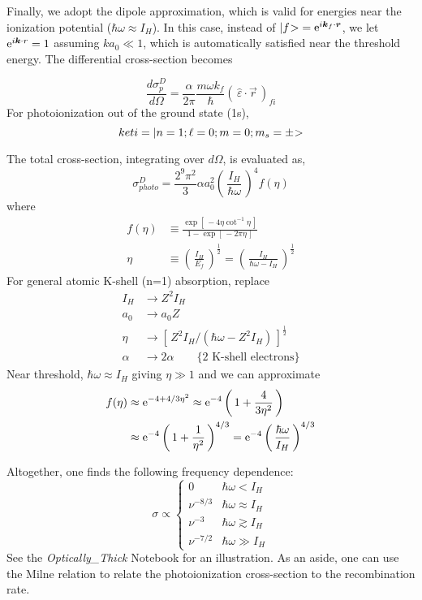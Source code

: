 \documentclass[graybox]{svmult}
\def\ohf{\frac{1}{2}}
\def\ket#1{{|#1\negmedspace>}}
\def\ltk{\left [ \,}
\def\ltp{\left ( \,}
\def\rtk{\, \right  ] }
\def\rtp{\, \right  ) }
\def\rme{{\rm e}}
\def\eng{\varepsilon}
\newcommand{\prfi}{\ltp \hat\eng \cdot \vec r \rtp_{fi}}
\begin{document}
Finally, we adopt the dipole approximation, which is
valid for energies near the ionization potential 
($\hbar \omega \approx I_H$).
In this case,  instead of $\ket{f} = \rme^{i \vec k_f \cdot \vec r}$, 
we let $\rme^{i \vec k \cdot r} = 1$ assuming
$k a_0 \ll 1$, which is automatically satisfied near the threshold energy.
The	differential cross-section becomes

\begin{equation}
	\frac{d\sigma^D_p}{d\Omega} = \frac{\alpha}{2\pi} 
	   \frac{m\omega k_f}{\hbar}  \prfi
\end{equation}
For photoionization out of the ground state (1s),
\begin{equation}
ket{i} = \ket{n=1; \ell=0; m=0; m_s=\pm} 
\end{equation}

The total cross-section, integrating over $d\Omega$, is 
evaluated as,
\begin{equation}
 \sigma^D_{photo} = \frac{2^9 \pi^2}{3} \alpha a_0^2 
    \ltp \frac{I_H}{\hbar\omega} \rtp^4 f(\eta)
\label{eqn:sigma_photo}
\end{equation}
where
	\begin{align}
	f(\eta) &\equiv \frac{\exp \ltk-4\eta \cot^{-1}\eta \rtk}
             {1 - \exp \ltk -2\pi\eta \rtk} \\
	\eta &\equiv \ltp \frac{I_H}{E_f} \rtp^\ohf = 
	   \ltp \frac{I_H}{\hbar\omega-I_H} \rtp^\ohf
	\end{align}
For general atomic K-shell (n=1) absorption, replace
\begin{align*}
	I_H &\to Z^2 I_H \\
	a_0 &\to a_0 Z \\
	\eta &\to \ltk Z^2 I_H / (\hbar\omega - Z^2 I_H) \rtk^\ohf \\
	\alpha &\to 2 \alpha  \quad\quad \{ \text{2 K-shell electrons} \}
\end{align*}
Near threshold, $\hbar\omega \approx I_H$ giving $\eta \gg 1$
and we can approximate
\begin{align}
	f(\eta) &\approx \rme^{-4 + 4/3\eta^2} \approx \rme^{-4} 
	   \ltp 1 + \frac{4}{3\eta^2} \rtp \\
	   &\approx \rme^{-4} \ltp 1 + \frac{1}{\eta^2} \rtp^{4/3} =
	   \rme^{-4} \ltp \frac{\hbar\omega}{I_H} \rtp^{4/3}
\end{align}

Altogether, one finds the following frequency dependence:
 \begin{equation}
 \sigma \propto \begin{cases} 0 & \hbar\omega < I_H \\
                             \nu^{-8/3} & \hbar\omega \approx I_H \\
			     \nu^{-3}   & \hbar\omega \gtrsim I_H \\
			     \nu^{-7/2} & \hbar\omega \gg I_H
		\end{cases}
 \end{equation}
See the {\it Optically\_Thick} Notebook for an illustration.
As an aside, one can use the Milne relation to relate the photoionization
cross-section to the recombination rate.
\end{document}
